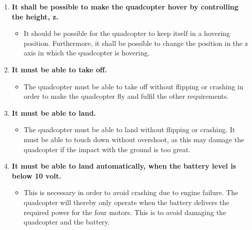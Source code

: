 \begin{enumerate}[label=\textbf{\arabic*})]
\item \textbf{It shall be possible to make the quadcopter hover by controlling the height, z.}
\begin{itemize}
\item[] It should be possible for the quadcopter to keep itself in a hovering position. Furthermore, it shall be possible to change the position in the z axis in which the quadcopter is hovering.
\end{itemize}


\item \textbf{It must be able to take off.}
\begin{itemize}
\item[]The quadcopter must be able to take off without flipping or crashing in order to make the quadcopter fly and fulfil the other requirements.
\end{itemize}
\newpage
\item \textbf{It must be able to land.}
\begin{itemize}
\item[]The quadcopter must be able to land without flipping or crashing. It must be able to touch down without overshoot, as this may damage the quadcopter if the impact with the ground is too great.
\end{itemize}


\item \textbf{It must be able to land automatically, when the battery level is below 10 volt.}
\begin{itemize}
\item[] This is necessary in order to avoid crashing due to engine failure. The quadcopter will thereby only operate when the battery delivers the required power for the four motors. This is to avoid damaging the quadcopter and the battery.
\end{itemize}

\end{enumerate}



